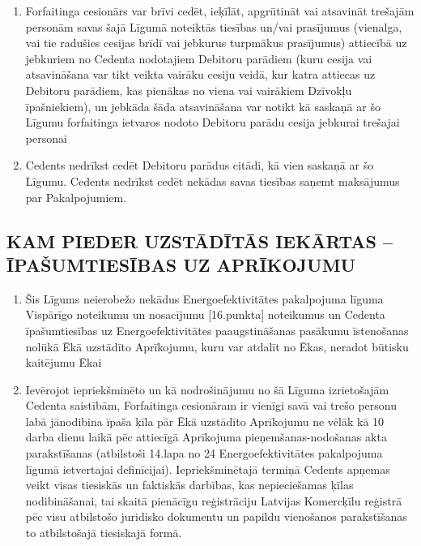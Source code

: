 \documentclass[a4paper]{article}
\begin{document}
\begin{multicols}{2}
  \begin{enumerate}
  \item{Forfaitinga cesionārs var brīvi cedēt, ieķīlāt, apgrūtināt vai atsavināt
trešajām personām savas šajā Līgumā noteiktās tiesības un/vai
prasījumus (vienalga, vai tie radušies cesijas brīdī vai jebkurus
turpmākus prasījumus) attiecībā uz jebkuriem no Cedenta nodotajiem
Debitoru parādiem (kuru cesija vai atsavināšana var tikt veikta vairāku
cesiju veidā, kur katra attiecas uz Debitoru parādiem, kas pienākas no
viena vai vairākiem Dzīvokļu īpašniekiem), un jebkāda šāda
atsavināšana var notikt kā saskaņā ar šo Līgumu forfaitinga ietvaros
nodoto Debitoru parādu cesija jebkurai trešajai personai}

  \item{Cedents nedrīkst cedēt Debitoru parādus citādi, kā vien saskaņā ar šo
Līgumu. Cedents nedrīkst cedēt nekādas savas tiesības saņemt
maksājumus par Pakalpojumiem.}
  \end{enumerate}

  \subsection{KAM PIEDER UZSTĀDĪTĀS IEKĀRTAS –
ĪPAŠUMTIESĪBAS UZ APRĪKOJUMU}

  \begin{enumerate}
  \item{Šis Līgums neierobežo nekādus Energoefektivitātes pakalpojuma
līguma Vispārīgo noteikumu un nosacījumu [16.punkta] noteikumus un
Cedenta īpašumtiesības uz Energoefektivitātes paaugstināšanas
pasākumu īstenošanas nolūkā Ēkā uzstādīto Aprīkojumu, kuru var
atdalīt no Ēkas, neradot būtisku kaitējumu Ēkai}

  \item{Ievērojot iepriekšminēto un kā nodrošinājumu no šā Līguma
izrietošajām Cedenta saistībām, Forfaitinga cesionāram ir vienīgi savā
vai trešo personu labā jānodibina īpaša ķīla pār Ēkā uzstādīto
Aprīkojumu ne vēlāk kā 10 darba dienu laikā pēc attiecīgā Aprīkojuma
pieņemšanas-nodošanas akta parakstīšanas (atbilstoši
14.lapa no 24 Energoefektivitātes pakalpojuma līgumā ietvertajai definīcijai).
Iepriekšminētajā termiņā Cedents apņemas veikt visas tiesiskās un
faktiskās darbības, kas nepieciešamas ķīlas nodibināšanai, tai skaitā
pienācīgu reģistrāciju Latvijas Komercķīlu reģistrā pēc visu atbilstošo
juridisko dokumentu un papildu vienošanos parakstīšanas to
atbilstošajā tiesiskajā formā.}
  \end{enumerate}


\end{multicols}
\end{document}
